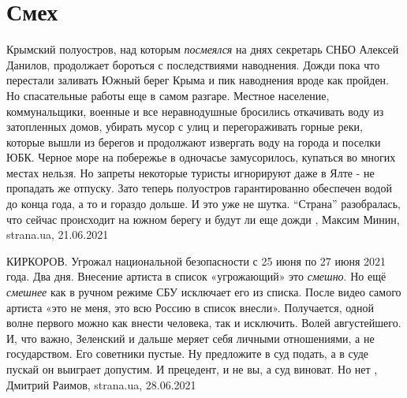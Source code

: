  
 
 
 
 
\chapter{Смех}
\label{sec:slova.smeh}

Крымский полуостров, над которым \emph{посмеялся} на днях секретарь СНБО
Алексей Данилов, продолжает бороться с последствиями наводнения.  Дожди пока
что перестали заливать Южный берег Крыма и пик наводнения вроде как пройден. Но
спасательные работы еще в самом разгаре.  Местное население, коммунальщики,
военные и все неравнодушные бросились откачивать воду из затопленных домов,
убирать мусор с улиц и перегораживать горные реки, которые вышли из берегов и
продолжают извергать воду на города и поселки ЮБК.  Черное море на побережье в
одночасье замусорилось, купаться во многих местах нельзя. Но запреты некоторые
туристы игнорируют даже в Ялте - не пропадать же отпуску.  Зато теперь
полуостров гарантированно обеспечен водой до конца года, а то и гораздо дольше.
И это уже не шутка.  \enquote{Страна} разобралась, что сейчас происходит на
южном берегу и будут ли еще дожди
, 
Максим Минин, strana.ua, 21.06.2021

КИРКОРОВ. Угрожал национальной безопасности с 25 июня по 27 июня 2021 года.
Два дня. Внесение артиста в список «угрожающий» это \emph{смешно}. Но ещё
\emph{смешнее} как в ручном режиме СБУ исключает его из списка.  После видео
самого артиста «это не меня, это всю Россию в список внесли».  Получается,
одной волне первого можно как внести человека, так и исключить.  Волей
августейшего.  И, что важно, Зеленский и дальше меряет себя личными
отношениями, а не государством. Его советники пустые.  Ну предложите в суд
подать, а в суде пускай он выиграет допустим. И прецедент, и не вы, а суд
виноват.  Но нет
, 
Дмитрий Раимов, strana.ua, 28.06.2021
